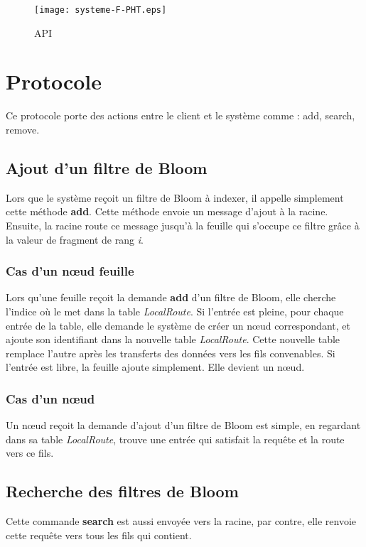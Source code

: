 \documentclass[a4paper,11pt]{report}
\begin{document}
	\begin{figure}[!htbp]
	\centering
	\texttt{[image: systeme-F-PHT.eps]}
	\caption{API}
	\label{systeme-F-PHT}
	\end{figure}	
	
	\newpage
	
\chapter{Protocole}
	Ce protocole porte des actions entre le client et le système comme : add, search, remove.
	
\section{Ajout d'un filtre de Bloom}
	Lors que le système reçoit un filtre de Bloom à indexer, il appelle simplement cette méthode \textbf{add}. Cette méthode envoie un message d'ajout à la racine. Ensuite, la racine route ce message jusqu'à la feuille qui s'occupe ce filtre grâce à la valeur de fragment de rang \textit{i}.

\subsection{Cas d'un nœud feuille}
	Lors qu'une feuille reçoit la demande \textbf{add} d'un filtre de Bloom, elle cherche l'indice où le met dans la table \textit{LocalRoute}. Si l'entrée est pleine, pour chaque entrée de la table, elle demande le système de créer un nœud correspondant, et ajoute son identifiant dans la nouvelle table \textit{LocalRoute}. Cette nouvelle table remplace l'autre après les transferts des données vers les fils convenables. Si l'entrée est libre, la feuille ajoute simplement. Elle devient un nœud.
	
\subsection{Cas d'un nœud}
	Un nœud reçoit la demande d'ajout d'un filtre de Bloom est simple, en regardant dans sa table \textit{LocalRoute}, trouve une entrée qui satisfait la requête et la route vers ce fils.
	
\section{Recherche des filtres de Bloom}
	Cette commande \textbf{search} est aussi envoyée vers la racine, par contre, elle renvoie cette requête vers tous les fils qui contient.
	
\end{document}
